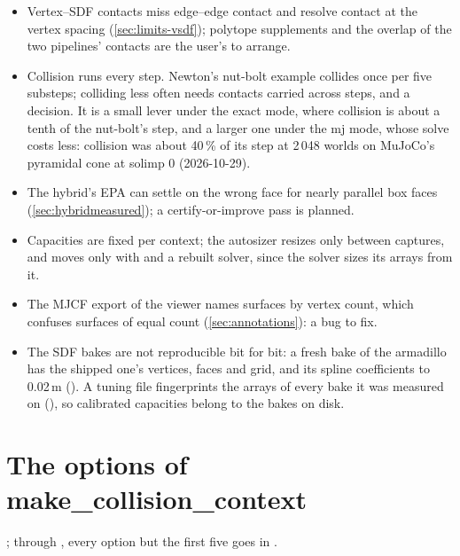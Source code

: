 \begin{itemize}
\item Vertex--SDF contacts miss edge--edge contact and resolve contact at the vertex spacing (\cref{sec:limits-vsdf}); polytope supplements and the overlap of the two pipelines' contacts are the user's to arrange.
\item Collision runs every step. Newton's nut-bolt example collides once per five substeps; colliding less often needs contacts carried across steps, and a decision. It is a small lever under the exact mode, where collision is about a tenth of the nut-bolt's step, and a larger one under the mj mode, whose solve costs less: collision was about 40\,\% of its step at 2\,048 worlds on MuJoCo's pyramidal cone at solimp  0 (2026-10-29).
\item The hybrid's EPA can settle on the wrong face for nearly parallel box faces (\cref{sec:hybridmeasured}); a certify-or-improve pass is planned.
\item Capacities are fixed per context; the autosizer resizes only between captures, and  moves only with  and a rebuilt solver, since the solver sizes its arrays from it.
\item The MJCF export of the viewer names surfaces by vertex count, which confuses surfaces of equal count (\cref{sec:annotations}): a bug to fix.
\item The SDF bakes are not reproducible bit for bit: a fresh bake of the armadillo has the shipped one's vertices, faces and grid, and its spline coefficients to 0.02\,\micro m (). A tuning file fingerprints the arrays of every bake it was measured on (), so calibrated capacities belong to the bakes on disk.
\end{itemize}

\appendix

\section{The options of make\_collision\_context}\label{app:options}

; through , every option but the first five goes in .

